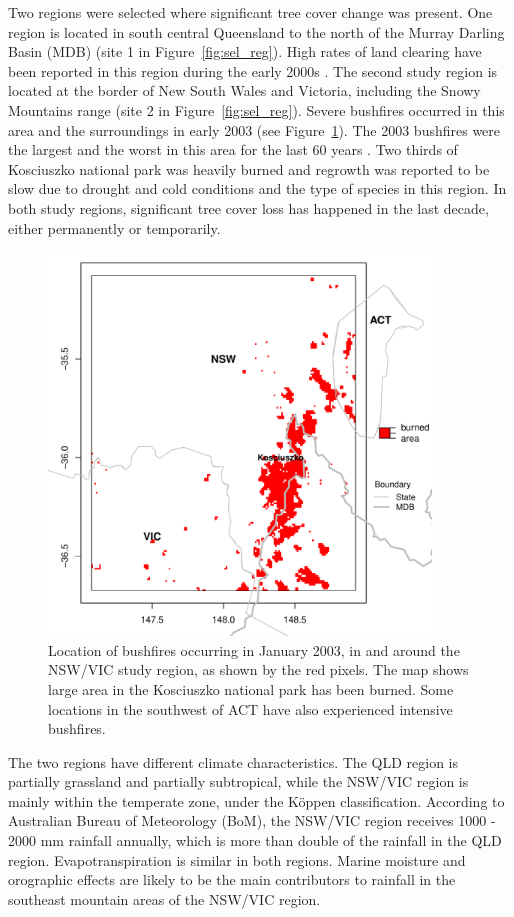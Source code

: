 \documentclass[authoryear,preprint,review,12pt]{elsarticle}
\begin{document}
Two regions were selected where significant tree cover change was present. One region is located in south central Queensland to the north of the Murray Darling Basin (MDB) (site 1 in Figure~\ref{fig:sel_reg}). High rates of land clearing have been reported in this region during the early 2000s \citep{SLATS2004}. The second study region is located at the border of New South Wales and Victoria, including the Snowy Mountains range (site 2 in Figure~\ref{fig:sel_reg}). Severe bushfires occurred in this area and the surroundings in early 2003 (see Figure~\ref{fig:bushfire}). The 2003 bushfires were the largest and the worst in this area for the last 60 years \citep{Fire2011}. Two thirds of Kosciuszko national park was heavily burned and regrowth was reported to be slow due to drought and cold conditions \citep{ABC2003} and the type of species in this region. In both study regions, significant tree cover loss has happened in the last decade, either permanently or temporarily.

\begin{figure}[ht!]
  \centerline{\includegraphics[height=4in, clip, scale=0.6]{bushfire_nswvic.pdf}}
  \caption{Location of bushfires occurring in January 2003, in and around the NSW/VIC study region, as shown by the red pixels. The map shows large area in the Kosciuszko national park has been burned. Some locations in the southwest of ACT have also experienced intensive bushfires.}
  \label{fig:bushfire}
\end{figure}

The two regions have different climate characteristics. The QLD region is partially grassland and partially subtropical, while the NSW/VIC region is mainly within the temperate zone, under the K\"{o}ppen classification. According to Australian Bureau of Meteorology (BoM), the NSW/VIC region receives 1000 - 2000 mm rainfall annually, which is more than double of the rainfall in the QLD region. Evapotranspiration is similar in both regions. Marine moisture and orographic effects are likely to be the main contributors to rainfall in the southeast mountain areas of the NSW/VIC region. 
\end{document}
